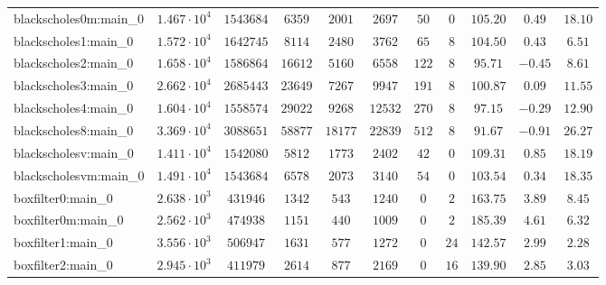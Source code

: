 \begin{tabular}{|l|c|c|c|c|c|c|c|c|c|c|}
blackscholes0m:main\_0         & $ 1.467 \cdot 10^{4} $ & $ 1543684  $ & $ 6359   $ & $ 2001   $ & $ 2697   $ & $ 50   $ & $ 0    $ & $ 105.20      $ & $ 0.49    $ & $ 18.10   $ \\
blackscholes1:main\_0          & $ 1.572 \cdot 10^{4} $ & $ 1642745  $ & $ 8114   $ & $ 2480   $ & $ 3762   $ & $ 65   $ & $ 8    $ & $ 104.50      $ & $ 0.43    $ & $ 6.51    $ \\
blackscholes2:main\_0          & $ 1.658 \cdot 10^{4} $ & $ 1586864  $ & $ 16612  $ & $ 5160   $ & $ 6558   $ & $ 122  $ & $ 8    $ & $ 95.71       $ & $ -0.45   $ & $ 8.61    $ \\
blackscholes3:main\_0          & $ 2.662 \cdot 10^{4} $ & $ 2685443  $ & $ 23649  $ & $ 7267   $ & $ 9947   $ & $ 191  $ & $ 8    $ & $ 100.87      $ & $ 0.09    $ & $ 11.55   $ \\
blackscholes4:main\_0          & $ 1.604 \cdot 10^{4} $ & $ 1558574  $ & $ 29022  $ & $ 9268   $ & $ 12532  $ & $ 270  $ & $ 8    $ & $ 97.15       $ & $ -0.29   $ & $ 12.90   $ \\
blackscholes8:main\_0          & $ 3.369 \cdot 10^{4} $ & $ 3088651  $ & $ 58877  $ & $ 18177  $ & $ 22839  $ & $ 512  $ & $ 8    $ & $ 91.67       $ & $ -0.91   $ & $ 26.27   $ \\
blackscholesv:main\_0          & $ 1.411 \cdot 10^{4} $ & $ 1542080  $ & $ 5812   $ & $ 1773   $ & $ 2402   $ & $ 42   $ & $ 0    $ & $ 109.31      $ & $ 0.85    $ & $ 18.19   $ \\
blackscholesvm:main\_0         & $ 1.491 \cdot 10^{4} $ & $ 1543684  $ & $ 6578   $ & $ 2073   $ & $ 3140   $ & $ 54   $ & $ 0    $ & $ 103.54      $ & $ 0.34    $ & $ 18.35   $ \\
boxfilter0:main\_0             & $ 2.638 \cdot 10^{3} $ & $ 431946   $ & $ 1342   $ & $ 543    $ & $ 1240   $ & $ 0    $ & $ 2    $ & $ 163.75      $ & $ 3.89    $ & $ 8.45    $ \\
boxfilter0m:main\_0            & $ 2.562 \cdot 10^{3} $ & $ 474938   $ & $ 1151   $ & $ 440    $ & $ 1009   $ & $ 0    $ & $ 2    $ & $ 185.39      $ & $ 4.61    $ & $ 6.32    $ \\
boxfilter1:main\_0             & $ 3.556 \cdot 10^{3} $ & $ 506947   $ & $ 1631   $ & $ 577    $ & $ 1272   $ & $ 0    $ & $ 24   $ & $ 142.57      $ & $ 2.99    $ & $ 2.28    $ \\
boxfilter2:main\_0             & $ 2.945 \cdot 10^{3} $ & $ 411979   $ & $ 2614   $ & $ 877    $ & $ 2169   $ & $ 0    $ & $ 16   $ & $ 139.90      $ & $ 2.85    $ & $ 3.03    $ \\

\end{tabular}
